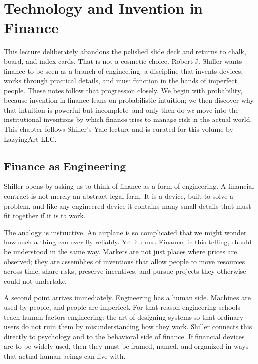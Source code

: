 \chapter{Technology and Invention in Finance}

This lecture deliberately abandons the polished slide deck and returns to chalk, board, and index cards. That is not a cosmetic choice. Robert J. Shiller wants finance to be seen as a branch of engineering: a discipline that invents devices, works through practical details, and must function in the hands of imperfect people. These notes follow that progression closely. We begin with probability, because invention in finance leans on probabilistic intuition; we then discover why that intuition is powerful but incomplete; and only then do we move into the institutional inventions by which finance tries to manage risk in the actual world. This chapter follows Shiller's Yale lecture and is curated for this volume by LazyingArt LLC.

\section{Finance as Engineering}

Shiller opens by asking us to think of finance as a form of engineering. A financial contract is not merely an abstract legal form. It is a device, built to solve a problem, and like any engineered device it contains many small details that must fit together if it is to work.

The analogy is instructive. An airplane is so complicated that we might wonder how such a thing can ever fly reliably. Yet it does. Finance, in this telling, should be understood in the same way. Markets are not just places where prices are observed; they are assemblies of inventions that allow people to move resources across time, share risks, preserve incentives, and pursue projects they otherwise could not undertake.

A second point arrives immediately. Engineering has a human side. Machines are used by people, and people are imperfect. For that reason engineering schools teach human factors engineering: the art of designing systems so that ordinary users do not ruin them by misunderstanding how they work. Shiller connects this directly to psychology and to the behavioral side of finance. If financial devices are to be widely used, then they must be framed, named, and organized in ways that actual human beings can live with.

